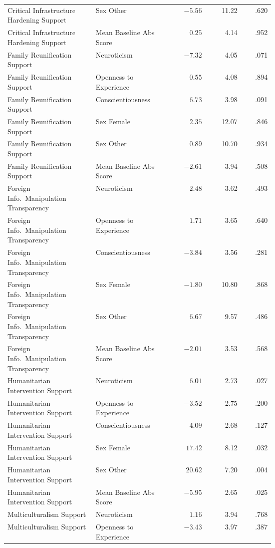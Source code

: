 \begin{longtable}{@{}p{0.33\linewidth}p{0.29\linewidth}rrr@{}}
Critical Infrastructure Hardening Support & Sex Other & $-5.56$ & 11.22 & .620 \\
Critical Infrastructure Hardening Support & Mean Baseline Abs Score & $0.25$ & 4.14 & .952 \\
\addlinespace
Family Reunification Support & Neuroticism & $-7.32$ & 4.05 & .071 \\
Family Reunification Support & Openness to Experience & $0.55$ & 4.08 & .894 \\
Family Reunification Support & Conscientiousness & $6.73$ & 3.98 & .091 \\
Family Reunification Support & Sex Female & $2.35$ & 12.07 & .846 \\
Family Reunification Support & Sex Other & $0.89$ & 10.70 & .934 \\
Family Reunification Support & Mean Baseline Abs Score & $-2.61$ & 3.94 & .508 \\
\addlinespace
Foreign Info.\ Manipulation Transparency & Neuroticism & $2.48$ & 3.62 & .493 \\
Foreign Info.\ Manipulation Transparency & Openness to Experience & $1.71$ & 3.65 & .640 \\
Foreign Info.\ Manipulation Transparency & Conscientiousness & $-3.84$ & 3.56 & .281 \\
Foreign Info.\ Manipulation Transparency & Sex Female & $-1.80$ & 10.80 & .868 \\
Foreign Info.\ Manipulation Transparency & Sex Other & $6.67$ & 9.57 & .486 \\
Foreign Info.\ Manipulation Transparency & Mean Baseline Abs Score & $-2.01$ & 3.53 & .568 \\
\addlinespace
Humanitarian Intervention Support & Neuroticism & $6.01$ & 2.73 & .027 \\
Humanitarian Intervention Support & Openness to Experience & $-3.52$ & 2.75 & .200 \\
Humanitarian Intervention Support & Conscientiousness & $4.09$ & 2.68 & .127 \\
Humanitarian Intervention Support & Sex Female & $17.42$ & 8.12 & .032 \\
Humanitarian Intervention Support & Sex Other & $20.62$ & 7.20 & .004 \\
Humanitarian Intervention Support & Mean Baseline Abs Score & $-5.95$ & 2.65 & .025 \\
\addlinespace
Multiculturalism Support & Neuroticism & $1.16$ & 3.94 & .768 \\
Multiculturalism Support & Openness to Experience & $-3.43$ & 3.97 & .387 \\

\end{longtable}
